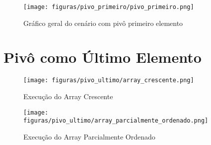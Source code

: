 \begin{figure}[H]
    \centering
    \caption{Gráfico geral do cenário com pivô primeiro elemento}
    \texttt{[image: figuras/pivo\_primeiro/pivo\_primeiro.png]}
    \label{fig:pivo_primeiro_grafico}
\end{figure}

\section{\esp Pivô como Último Elemento}

\begin{table}[H]
    \centering
    \scriptsize
    \caption{Comparação dos cenários com pivô sendo o ultimo elemento, considerando $n=1000$.}
    \label{tab:pivo_primeiro}
    
\end{table}

\begin{figure}[H]
    \centering
    \caption{Execução do Array Crescente}
    \texttt{[image: figuras/pivo\_ultimo/array\_crescente.png]}
    \label{fig:pivo_ultimo_crescente}
\end{figure}

\begin{figure}[H]
    \centering
    \caption{Execução do Array Parcialmente Ordenado}
    \texttt{[image: figuras/pivo\_ultimo/array\_parcialmente\_ordenado.png]}
    \label{fig:pivo_ultimo_parcialmente}
\end{figure}

